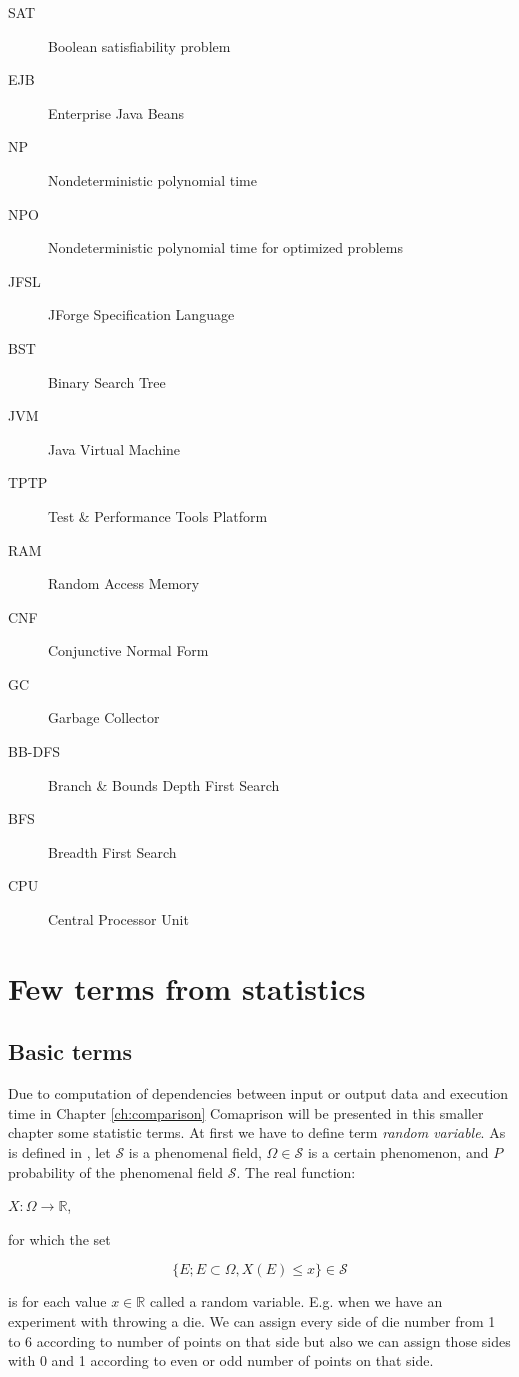 \documentclass[11pt,twoside,a4paper]{book}
\begin{document}
\begin{description}
\item[SAT] Boolean satisfiability problem
\item[EJB] Enterprise Java Beans
\item[NP] Nondeterministic polynomial time
\item[NPO] Nondeterministic polynomial time for optimized problems
\item[JFSL] JForge Specification Language
\item[BST] Binary Search Tree
\item[JVM] Java Virtual Machine
\item[TPTP] Test \& Performance Tools Platform
\item[RAM] Random Access Memory
\item[CNF] Conjunctive Normal Form
\item[GC] Garbage Collector
\item[BB-DFS] Branch \& Bounds Depth First Search
\item[BFS] Breadth First Search
\item[CPU] Central Processor Unit
\end{description}


\chapter{Few terms from statistics}
\label{ch:statistics}

\section{Basic terms}
Due to computation of dependencies between input or output data and execution
time in Chapter \ref{ch:comparison} Comaprison will be presented in this smaller
chapter some statistic terms. At first we have to define term \textit{random
variable}. As is defined in \cite{navara:mvt}, let $\mathcal{S}$ is a
phenomenal field, $\Omega\in\mathcal{S}$ is a certain phenomenon, and
$P$ probability of the phenomenal field $\mathcal{S}$. The real
function: 
\begin{center}
$X:\Omega \rightarrow \mathbb{R}$,
\end{center}

for which the set

$$\{E; E \subset \Omega, X\left(E\right) \leq x\} \in
\mathcal{S}$$

is for each value $x \in \mathbb{R}$ called a random variable. E.g. when we
have an experiment with throwing a die. We can assign every side of die number
from 1 to 6 according to number of points on that side but also we can assign
those sides with 0 and 1 according to even or odd number of points on that side.
\end{document}
